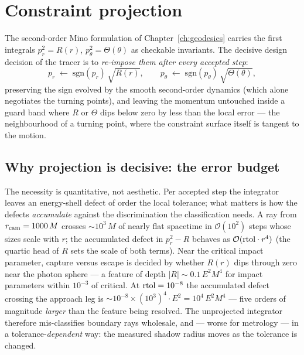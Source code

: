 \section{Constraint projection}
\label{sec:projection}

The second-order Mino formulation of Chapter~\ref{ch:geodesics} carries
the first integrals $p_r^2 = R(r)$, $p_\theta^2 = \Theta(\theta)$ as
checkable invariants. The decisive design decision of the tracer is to
\emph{re-impose them after every accepted step}:
\begin{equation}
p_r \;\leftarrow\; \mathrm{sgn}(p_r)\,\sqrt{R(r)}, \qquad
p_\theta \;\leftarrow\; \mathrm{sgn}(p_\theta)\,\sqrt{\Theta(\theta)},
\label{eq:projection}
\end{equation}
preserving the sign evolved by the smooth second-order dynamics (which
alone negotiates the turning points), and leaving the momentum untouched
inside a guard band where $R$ or $\Theta$ dips below zero by less than
the local error — the neighbourhood of a turning point, where the
constraint surface itself is tangent to the motion.

\subsection{Why projection is decisive: the error budget}

The necessity is quantitative, not aesthetic. Per accepted step the
integrator leaves an energy-shell defect of order the local tolerance;
what matters is how the defects \emph{accumulate} against the
discrimination the classification needs. A ray from
$r_{\rm cam} = 1000\,M$ crosses $\sim$$10^3\,M$ of nearly flat spacetime
in $\mathcal{O}(10^2)$ steps whose sizes scale with $r$; the
accumulated defect in $p_r^2 - R$ behaves as
$\mathcal{O}({\rm rtol}\cdot r^4)$ (the quartic head of $R$ sets the
scale of both terms). Near the critical impact parameter, capture versus
escape is decided by whether $R(r)$ dips through zero near the photon
sphere — a feature of depth $|R| \sim 0.1\,E^2M^4$ for impact parameters
within $10^{-3}$ of critical. At ${\rm rtol} = 10^{-8}$ the accumulated
defect crossing the approach leg is $\sim 10^{-8}\times(10^3)^4\cdot
E^2 = 10^4\,E^2M^4$ — five orders of magnitude \emph{larger} than the
feature being resolved. The unprojected integrator therefore
mis-classifies boundary rays wholesale, and — worse for metrology — in a
tolerance-\emph{dependent} way: the measured shadow radius moves as the
tolerance is changed.

